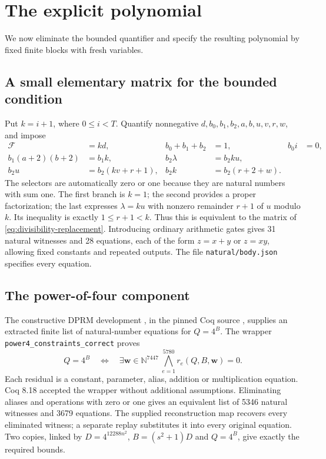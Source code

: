 \documentclass[11pt]{article}
\theoremstyle{definition}
\newcommand{\N}{\mathbb N}\newcommand{\F}{\mathbb F}
\begin{document}
\section{The explicit polynomial}\label{sec:completed-definition}
We now eliminate the bounded quantifier and specify the resulting
polynomial by fixed finite blocks with fresh variables.

\subsection{A small elementary matrix for the bounded condition}

Put \(k=i+1\), where \(0\le i<T\). Quantify nonnegative
\(d,b_0,b_1,b_2,a,b,u,v,r,w\), and impose
\begin{align}
 \mathcal F&=kd,& b_0+b_1+b_2&=1,& b_0i&=0,\nonumber\\
 b_1(a+2)(b+2)&=b_1k,&
 b_2\lambda&=b_2ku,\label{eq:elementary-divisibility}\\
 b_2u&=b_2(kv+r+1),&
 b_2k&=b_2(r+2+w).\nonumber
\end{align}
The selectors are automatically zero or one because they are natural
numbers with sum one. The first branch is \(k=1\); the second
provides a proper factorization; the last expresses
\(\lambda=ku\) with nonzero remainder \(r+1\) of \(u\) modulo
\(k\). Its inequality is exactly \(1\le r+1<k\).
Thus this is equivalent to the matrix of
\eqref{eq:divisibility-replacement}. Introducing ordinary arithmetic
gates gives 31 natural witnesses and 28 equations, each of the form
\(z=x+y\) or \(z=xy\), allowing fixed constants and repeated
outputs. The file \texttt{natural/body.json} specifies every equation.

\subsection{The power-of-four component}\label{sec:executed-dprm}
The constructive DPRM development \cite{DPRMCoq}, in the pinned
Coq source \cite{DPRMLibrary}, supplies an extracted
finite list of natural-number equations for \(Q=4^B\). The wrapper
\texttt{power4\_constraints\_correct} proves
\begin{equation}\label{eq:power4-checked}
 Q=4^B\quad\Longleftrightarrow\quad
 \exists\mathbf w\in\N^{7447}\ \bigwedge_{e=1}^{5780}r_e(Q,B,\mathbf w)=0.
\end{equation}
Each residual is a constant, parameter, alias, addition or multiplication
equation. Coq 8.18 accepted the wrapper without additional assumptions.
Eliminating aliases and operations with zero or one gives an equivalent
list of 5346 natural witnesses and 3679 equations. The supplied
reconstruction map recovers every eliminated witness; a separate replay
substitutes it into every original equation. Two copies, linked by
\(D=4^{12288n^2}\), \(B=(s^2+1)D\) and \(Q=4^B\),
give exactly the required bounds.
\end{document}

